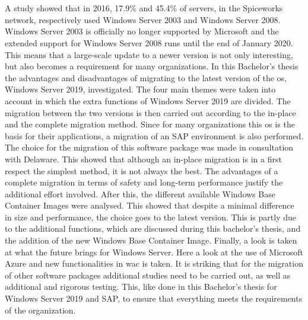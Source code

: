 \chapter*{}
A study \autocite{Tsai2016} showed that in 2016, 17.9\% and 45.4\% of servers, in the Spiceworks network, respectively used Windows Server 2003 and Windows Server 2008. Windows Server 2003 is officially no longer supported by Microsoft and the extended support for Windows Server 2008 runs until the end of January 2020. This means that a large-scale update to a newer version is not only interesting, but also becomes a requirement for many organizations. In this Bachelor's thesis the advantages and disadvantages of migrating to the latest version of the \acrshort{os},
Windows Server 2019, investigated. The four main themes were taken into account in which the extra functions of Windows Server 2019 are divided. The migration between the two versions is then carried out according to the in-place and the complete migration method. Since for many organizations this \acrshort{os} is the basis for their applications, a migration of an SAP environment is also performed. The choice for the
migration of this software package was made in consultation with Delaware. 
This showed that although an in-place migration is in a first respect the simplest method, it is not always the best. The advantages of a complete migration in terms of safety and long-term performance justify the additional effort involved.
After this, the different available Windows Base Container Images were analysed. This showed that despite a minimal difference in size and performance, the choice goes to the latest version. This is partly due to the additional functions, which are discussed during this bachelor's thesis, and the addition of the new Windows Base Container Image.
Finally, a look is taken at what the future brings for Windows Server. Here a look at the use of Microsoft Azure and new functionalities in \acrlong{wac} is taken. 
It is striking that for the migration of other software packages additional studies need to be carried out, as well as additional and rigorous testing. This, like done in this Bachelor's thesis for Windows Server 2019 and SAP, to ensure that everything meets the requirements of the organization.
